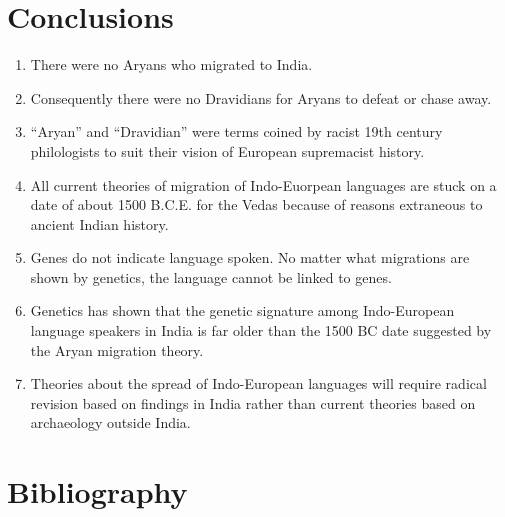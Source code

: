 \section*{Conclusions}

\begin{enumerate}[{\rm 1)}]
\itemsep=0pt
\item There were no Aryans who migrated to India.

 \item Consequently there were no Dravidians for Aryans to defeat or chase away.

 \item “Aryan” and “Dravidian” were terms coined by racist 19th century philologists to suit their vision of European supremacist history.

 \item All current theories of migration of Indo-Euorpean languages are stuck on a date of about 1500 B.C.E. for the Vedas because of reasons extraneous to ancient Indian history.

 \item Genes do not indicate language spoken. No matter what migrations are shown by genetics, the language cannot be linked to genes.

 \item Genetics has shown that the genetic signature among Indo-European language speakers in India is far older than the 1500 BC date suggested by the Aryan migration theory.

 \item Theories about the spread of Indo-European languages will require radical revision based on findings in India rather than current theories based on archaeology outside India.

\end{enumerate}


\section*{Bibliography}

